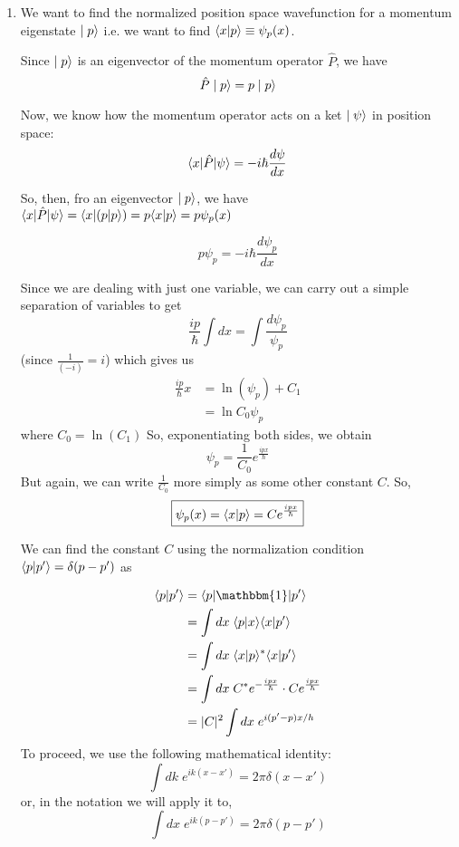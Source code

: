 \documentclass[twoside]{article}
\begin{document}
\begin{enumerate}
   \item We want to find the normalized position space wavefunction for a momentum eigenstate $\mid p\rangle$ i.e. we want to find $\langle x | p \rangle \equiv \psi_p (x)$.
   
   Since $\mid p\rangle$ is an eigenvector of the momentum operator $\hat{P}$, we have 
   \[ \hat{P}\mid p\rangle = p\mid p\rangle \]

   Now, we know how the momentum operator acts on a ket $\mid\psi\rangle$ in position space:
   \[ \langle x | \hat{P}|\psi \rangle = -i\hbar \frac{d\psi}{dx}\]

   So, then, fro an eigenvector $\mid p\rangle$, we have $\langle x | \hat{P}|\psi \rangle = \langle x | (p|p \rangle) = p\langle x | p \rangle = p\psi_p(x)$

   \[ p\psi_p = -i\hbar \frac{d\psi_p}{dx} \]
   
   Since we are dealing with just one variable, we can carry out a simple separation of variables to get 
   \[ \frac{ip}{\hbar} \int dx = \int \frac{d\psi_p}{\psi_p}\] (since $\frac{1}{(-i)} = i$) which gives us 
   \begin{align*}
      \frac{ip}{\hbar} x &= \ln(\psi_p) + C_1 \\
                         &= \ln{C_0 \psi_p} 
   \end{align*} where $C_0 = \ln(C_1)$
   So, exponentiating both sides, we obtain
   \[ \psi_p = \frac{1}{C_0} e^{\frac{ipx}{\hbar}}\]
   But again, we can write $\frac{1}{C_0}$ more simply as some other constant $C$. So,
   \begin{equation}
      \boxed{\psi_p(x) = \langle x | p \rangle = C e^{\frac{ipx}{\hbar}}} 
   \end{equation}
   
   We can find the constant $C$ using the normalization condition $\langle p | p' \rangle = \delta(p - p')$ as 

   \begin{align*}
      \inner{p}{p'} &= \inner{p}{\mathbbm{1}|p'} \\
                    &= \int dx\; \inner{p}{x} \inner{x}{p'} \\
                    &= \int dx\; \inner{x}{p}^{*} \inner{x}{p'} \\
                    &= \int dx\; C^{*}e^{-\frac{ipx}{\hbar}} \cdot Ce^{\frac{ipx}{\hbar}} \\
                    &= |C|^2 \int dx\; e^{i(p'-p)x/h}
   \end{align*}
   To proceed, we use the following mathematical identity:
   \[ \int dk\; e^{ik(x-x')} = 2\pi\delta(x-x') \]
   or, in the notation we will apply it to,
   \[ \boxed{\int dx\; e^{ik(p-p')} = 2\pi\delta(p-p')} \]


\end{enumerate}
\end{document}
